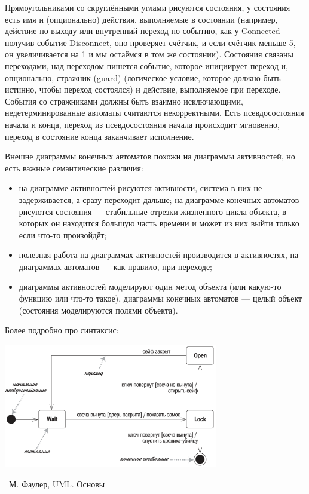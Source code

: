 \documentclass[a5paper]{article}
\newcommand{\attribution}[1] {
    \vspace{-5mm}\begin{flushright}\begin{scriptsize}%
    {\textcopyright\, #1}\end{scriptsize}\end{flushright}
}
\begin{document}
Прямоугольниками со скруглёнными углами рисуются состояния, у состояния есть имя и (опционально) действия, выполняемые в состоянии (например, действие по выходу или внутренний переход по событию, как у Connected --- получив событие Disconnect, оно проверяет счётчик, и если счётчик меньше 5, он увеличивается на 1 и мы остаёмся в том же состоянии). Состояния связаны переходами, над переходом пишется событие, которое инициирует переход и, опционально, стражник (guard) (логическое условие, которое должно быть истинно, чтобы переход состоялся) и действие, выполняемое при переходе. События со стражниками должны быть взаимно исключающими, недетерминированные автоматы считаются некорректными. Есть псевдосостояния начала и конца, переход из псевдосостояния начала происходит мгновенно, переход в состояние конца заканчивает исполнение.

Внешне диаграммы конечных автоматов похожи на диаграммы активностей, но есть важные семантические различия:

\begin{itemize}
    \item на диаграмме активностей рисуются активности, система в них не задерживается, а сразу переходит дальше; на диаграмме конечных автоматов рисуются состояния --- стабильные отрезки жизненного цикла объекта, в которых он находится большую часть времени и может из них выйти только если что-то произойдёт;
    \item полезная работа на диаграммах активностей производится в активностях, на диаграммах автоматов --- как правило, при переходе;
    \item диаграммы активностей моделируют один метод объекта (или какую-то функцию или что-то такое), диаграммы конечных автоматов --- целый объект (состояния моделируются полями объекта).
\end{itemize}

Более подробно про синтаксис:

\begin{center}
    \includegraphics[width=0.7\textwidth]{stateTransitionSyntax.png}
    \attribution{М. Фаулер, UML. Основы}
\end{center}
\end{document}
